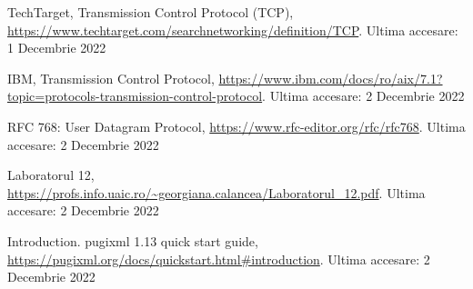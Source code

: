 \documentclass[runningheads]{llncs}
\begin{document}
\begin{thebibliography}{8}
TechTarget, Transmission Control Protocol (TCP), \url{https://www.techtarget.com/searchnetworking/definition/TCP}. Ultima accesare: 1 Decembrie 2022

IBM, Transmission Control Protocol, \url{https://www.ibm.com/docs/ro/aix/7.1?topic=protocols-transmission-control-protocol}. Ultima accesare: 2 Decembrie 2022

RFC 768: User Datagram Protocol, \url{https://www.rfc-editor.org/rfc/rfc768}.
Ultima accesare: 2 Decembrie 2022

Laboratorul 12, \url{https://profs.info.uaic.ro/~georgiana.calancea/Laboratorul_12.pdf}. Ultima accesare: 2 Decembrie 2022

Introduction. pugixml 1.13 quick start guide, \url{https://pugixml.org/docs/quickstart.html#introduction}.  Ultima accesare: 2 Decembrie 2022

\end{thebibliography}
\end{document}
